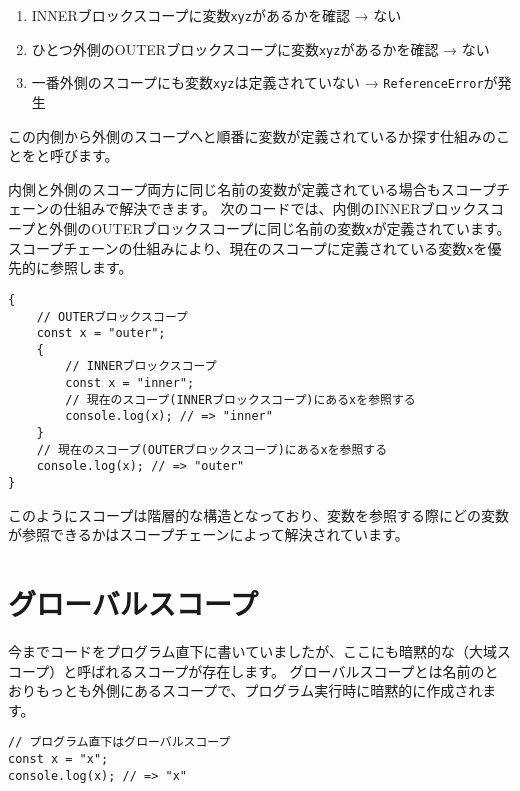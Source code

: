 \begin{enumerate}
\def\labelenumi{\arabic{enumi}.}
\item
  INNERブロックスコープに変数\texttt{xyz}があるかを確認 → ない
\item
  ひとつ外側のOUTERブロックスコープに変数\texttt{xyz}があるかを確認 → ない
\item
  一番外側のスコープにも変数\texttt{xyz}は定義されていない → \texttt{ReferenceError}が発生
\end{enumerate}

この内側から外側のスコープへと順番に変数が定義されているか探す仕組みのことを\textbf{}と呼びます。

内側と外側のスコープ両方に同じ名前の変数が定義されている場合もスコープチェーンの仕組みで解決できます。
次のコードでは、内側のINNERブロックスコープと外側のOUTERブロックスコープに同じ名前の変数\texttt{x}が定義されています。
スコープチェーンの仕組みにより、現在のスコープに定義されている変数\texttt{x}を優先的に参照します。

\begin{lstlisting}
{
    // OUTERブロックスコープ
    const x = "outer";
    {
        // INNERブロックスコープ
        const x = "inner";
        // 現在のスコープ(INNERブロックスコープ)にあるxを参照する
        console.log(x); // => "inner"
    }
    // 現在のスコープ(OUTERブロックスコープ)にあるxを参照する
    console.log(x); // => "outer"
}
\end{lstlisting}

このようにスコープは階層的な構造となっており、変数を参照する際にどの変数が参照できるかはスコープチェーンによって解決されています。

\hypertarget{global-scope}{%
\section{グローバルスコープ}\label{global-scope}}

今までコードをプログラム直下に書いていましたが、ここにも暗黙的な\textbf{}（大域スコープ）と呼ばれるスコープが存在します。
グローバルスコープとは名前のとおりもっとも外側にあるスコープで、プログラム実行時に暗黙的に作成されます。

\begin{lstlisting}
// プログラム直下はグローバルスコープ
const x = "x";
console.log(x); // => "x"
\end{lstlisting}

